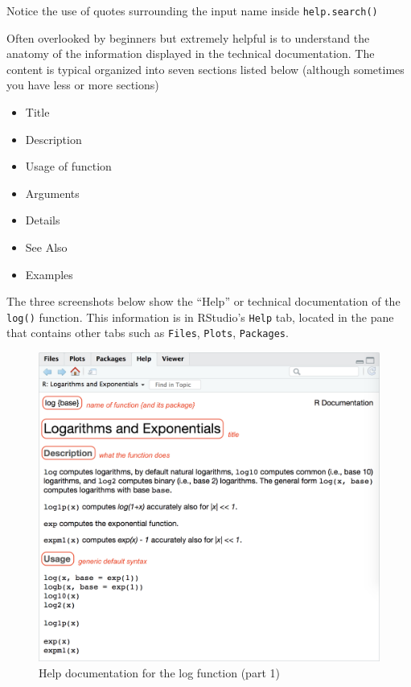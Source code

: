 \documentclass[
]{book}
\providecommand{\tightlist}{%
  \setlength{\itemsep}{0pt}\setlength{\parskip}{0pt}}
\begin{document}
Notice the use of quotes surrounding the input name inside \texttt{help.search()}

Often overlooked by beginners but extremely helpful is to understand the
anatomy of the information displayed in the technical documentation. The
content is typical organized into seven sections listed below (although
sometimes you have less or more sections)

\begin{itemize}
\tightlist
\item
  Title
\item
  Description
\item
  Usage of function
\item
  Arguments
\item
  Details
\item
  See Also
\item
  Examples
\end{itemize}

The three screenshots below show the ``Help'' or technical documentation of the
\texttt{log()} function. This information is in RStudio's \texttt{Help} tab, located in the
pane that contains other tabs such as \texttt{Files}, \texttt{Plots}, \texttt{Packages}.

\begin{figure}

{\centering \includegraphics[width=0.8\linewidth]{images/rstudio/help-log-1} 

}

\caption{Help documentation for the log function (part 1)}\label{fig:unnamed-chunk-20}
\end{figure}
\end{document}
